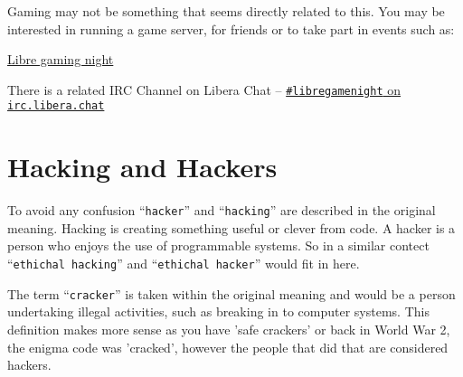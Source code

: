 \documentclass{extbook}
\newcommand\libera[1]{\href{https://web.libera.chat/?channel=\##1}{\texttt{\##1} on \texttt{irc.libera.chat}}}
\begin{document}
Gaming may not be something that seems directly related to this. You may be interested in running a game server, for friends or to take part in events such as:

\href{https://libregaming.org/}{Libre gaming night}

There is a related IRC Channel on Libera Chat -- \libera{libregamenight}

\chapter{Hacking and Hackers}

To avoid any confusion  ``\verb|hacker|'' and ``\verb|hacking|'' are described in the original meaning. Hacking is creating something useful or clever from code. A hacker is a person who enjoys the use of programmable systems.  So in a similar contect ``\verb|ethichal hacking|'' and ``\verb|ethichal hacker|'' would fit in here. 

The term ``\verb|cracker|'' is taken within the original meaning and would be a person undertaking illegal activities, such as breaking in to computer systems. This definition makes more sense as you have 'safe crackers' or back in World War 2, the enigma code was 'cracked', however the people that did that are considered hackers. 




\appendix

\end{document}

